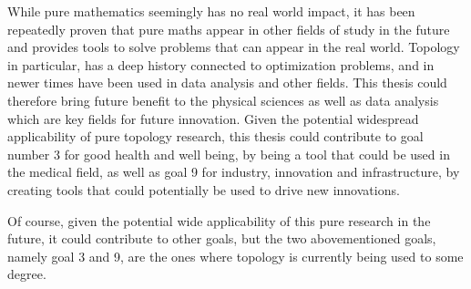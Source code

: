 While pure mathematics seemingly has no real world impact, it has been repeatedly proven that pure maths appear in other fields of study in the future and provides tools to solve problems that can appear in the real world. Topology in particular, has a deep history connected to optimization problems, and in newer times have been used in data analysis and other fields. This thesis could therefore bring future benefit to the physical sciences as well as data analysis which are key fields for future innovation. Given the potential widespread applicability of pure topology research, this thesis could contribute to goal number 3 for good health and well being, by being a tool that could be used in the medical field, as well as goal 9 for industry, innovation and infrastructure, by creating tools that could potentially be used to drive new innovations.

Of course, given the potential wide applicability of this pure research in the future, it could contribute to other goals, but the two abovementioned goals, namely goal 3 and 9, are the ones where topology is currently being used to some degree.
